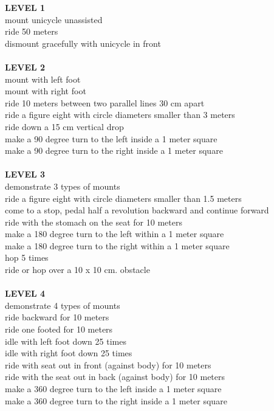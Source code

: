 \newpage
\begingroup
 \small
\begin{multicols}{2}
\textbf{LEVEL 1}\\
mount unicycle unassisted\\
ride 50 meters\\
dismount gracefully with unicycle in front\\\\
\textbf{LEVEL 2}\\
mount with left foot\\
mount with right foot\\
ride 10 meters between two parallel lines 30 cm apart\\
ride a figure eight with circle diameters smaller than 3 meters\\
ride down a 15 cm vertical drop\\
make a 90 degree turn to the left inside a 1 meter square\\
make a 90 degree turn to the right inside a 1 meter square\\\\
\textbf{LEVEL 3}\\
demonstrate 3 types of mounts\\
ride a figure eight with circle diameters smaller than 1.5 meters\\
come to a stop, pedal half a revolution backward and continue forward\\
ride with the stomach on the seat for 10 meters\\
make a 180 degree turn to the left within a 1 meter square\\
make a 180 degree turn to the right within a 1 meter square\\
hop 5 times\\
ride or hop over a 10 x 10 cm.
obstacle\\\\
\textbf{LEVEL 4}\\
demonstrate 4 types of mounts\\
ride backward for 10 meters\\
ride one footed for 10 meters\\
idle with left foot down 25 times\\
idle with right foot down 25 times\\
ride with seat out in front (against body) for 10 meters\\
ride with the seat out in back (against body) for 10 meters\\
make a 360 degree turn to the left inside a 1 meter square\\
make a 360 degree turn to the right inside a 1 meter square\\
\columnbreak


\end{multicols}
